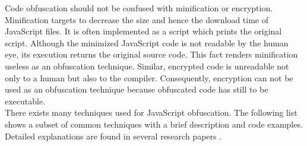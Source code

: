 			Code obfuscation should not be confused with minification or encryption. Minification targets to decrease the size and hence the download time of JavaScript files. It is often implemented as a script which prints the original script. Although the minimized JavaScript code is not readable by the human eye, its execution returns the original source code. This fact renders minification useless as an obfuscation technique. Similar, encrypted code is unreadable not only to a human but also to the compiler. Consequently, encryption can not be used as an obfuscation technique because obfuscated code has still to be executable. \\
	
			There exists many techniques used for JavaScript obfuscation. The following list shows a subset of common techniques with a brief description and code examples. Detailed explanations are found in several research papers \cite{caffinemonkey, Xu:2013:JMS:2435349.2435364, kim2011suspicious}.
			
